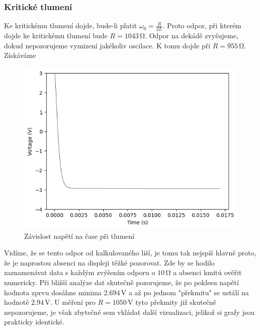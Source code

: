 \documentclass[czech,11pt,a4paper]{article}
\begin{document}
\begin{multicols}{2}
		\subsubsection{Kritické tlumení}
		Ke kritickému tlumení dojde, bude-li platit $\omega_{0} = \frac{R}{2L}$. Proto odpor, při kterém dojde ke kritickému tlumení bude $R=1043 \,\mathrm{\Omega}$.
		Odpor na dekádě zvyšujeme, dokud nepozorujeme vymizení jakékoliv oscilace. K tomu dojde při $R = 955 \,\mathrm{\Omega}$. Získáváme
		\begin{figure}[H]
			\begin{center}
				\includegraphics[max width=0.9\linewidth, center]{kriticke}
				\caption{Závislost napětí na čase při tlumení}\end{center}\end{figure}
		Vidíme, že se tento odpor od kalkulovaného liší, je tomu tak nejspíš hlavně proto, že je naprostou absenci na displeji těžké pozorovat. Zde by se hodilo zaznamenávat data s každým zvýšením odporu o $10 \,\mathrm{\Omega}$ a absenci kmitů ověřit numericky. Při bližší analýze dat skutečně pozorujeme, že po poklesu napětí hodnota zprvu dosáhne minima $2.694\,\mathrm{V}$ a až po jednom "překmitu" se ustálí na hodnotě $2.94 \,\mathrm{V}$. U měření pro $R = 1050\,\mathrm{V}$ tyto překmity již skutečně nepozorujeme, je však zbytečné sem vkládat další vizualizaci, jelikož si grafy jsou prakticky identické.

\end{multicols}
\end{document}
